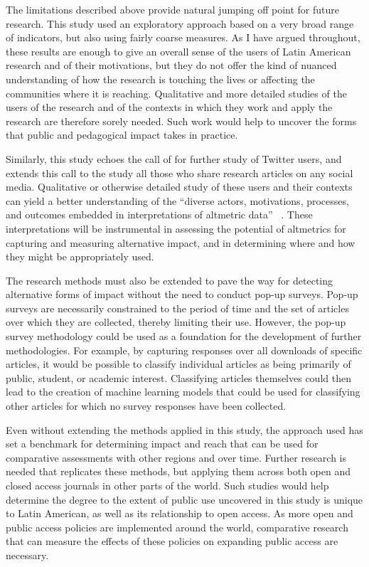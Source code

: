 The limitations described above provide natural jumping off point for future research. This study used an exploratory approach based on a very broad range of indicators, but also using fairly coarse measures. As I have argued throughout, these results are enough to give an overall sense of the users of Latin American research and of their motivations, but they do not offer the kind of nuanced understanding of how the research is touching the lives or affecting the communities where it is reaching. Qualitative and more detailed studies of the users of the research and of the contexts in which they work and apply the research are therefore sorely needed. Such work would help to uncover the forms that public and pedagogical impact takes in practice.

Similarly, this study echoes the call of  \citet{Haustein2013} for further study of Twitter users, and extends this call to the study all those who share research articles on any social media. Qualitative or otherwise detailed study of these users and their contexts can yield a better understanding of the ``diverse actors, motivations, processes, and outcomes embedded in interpretations of altmetric data'' ~\citep[p. 18]{Haustein2013}. These interpretations will be instrumental in assessing the potential of altmetrics for capturing and measuring alternative impact, and in determining where and how they might be appropriately used.

The research methods must also be extended to pave the way for detecting alternative forms of impact without the need to conduct pop-up surveys. Pop-up surveys are necessarily constrained to the period of time and the set of articles over which they are collected, thereby limiting their use. However, the pop-up survey methodology could be used as a foundation for the development of further methodologies. For example, by capturing responses over all downloads of specific articles, it would be possible to classify individual articles as being primarily of public, student, or academic interest. Classifying articles themselves could then lead to the creation of machine learning models that could be used for classifying other articles for which no survey responses have been collected.

Even without extending the methods applied in this study, the approach used has set a benchmark for determining impact and reach that can be used for comparative assessments with other regions and over time. Further research is needed that replicates these methods, but applying them across both open and closed access journals in other parts of the world. Such studies would help determine the degree to the extent of public use uncovered in this study is unique to Latin American, as well as its relationship to open access. As more open and public access policies are implemented around the world, comparative research that can measure the effects of these policies on expanding public access are necessary.

